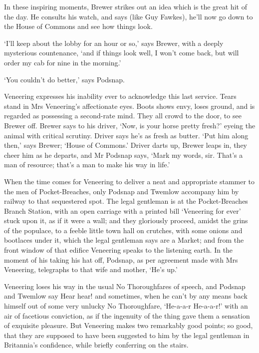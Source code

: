 In these inspiring moments, Brewer strikes out an idea which is the
great hit of the day. He consults his watch, and says (like Guy Fawkes),
he’ll now go down to the House of Commons and see how things look.

‘I’ll keep about the lobby for an hour or so,’ says Brewer, with a
deeply mysterious countenance, ‘and if things look well, I won’t come
back, but will order my cab for nine in the morning.’

‘You couldn’t do better,’ says Podsnap.

Veneering expresses his inability ever to acknowledge this last service.
Tears stand in Mrs Veneering’s affectionate eyes. Boots shows envy,
loses ground, and is regarded as possessing a second-rate mind. They all
crowd to the door, to see Brewer off. Brewer says to his driver, ‘Now,
is your horse pretty fresh?’ eyeing the animal with critical scrutiny.
Driver says he’s as fresh as butter. ‘Put him along then,’ says Brewer;
‘House of Commons.’ Driver darts up, Brewer leaps in, they cheer him as
he departs, and Mr Podsnap says, ‘Mark my words, sir. That’s a man of
resource; that’s a man to make his way in life.’

When the time comes for Veneering to deliver a neat and appropriate
stammer to the men of Pocket-Breaches, only Podsnap and Twemlow
accompany him by railway to that sequestered spot. The legal gentleman
is at the Pocket-Breaches Branch Station, with an open carriage with a
printed bill ‘Veneering for ever’ stuck upon it, as if it were a wall;
and they gloriously proceed, amidst the grins of the populace, to a
feeble little town hall on crutches, with some onions and bootlaces
under it, which the legal gentleman says are a Market; and from the
front window of that edifice Veneering speaks to the listening earth.
In the moment of his taking his hat off, Podsnap, as per agreement made
with Mrs Veneering, telegraphs to that wife and mother, ‘He’s up.’

Veneering loses his way in the usual No Thoroughfares of speech, and
Podsnap and Twemlow say Hear hear! and sometimes, when he can’t by any
means back himself out of some very unlucky No Thoroughfare, ‘He-a-a-r
He-a-a-r!’ with an air of facetious conviction, as if the ingenuity of
the thing gave them a sensation of exquisite pleasure. But Veneering
makes two remarkably good points; so good, that they are supposed
to have been suggested to him by the legal gentleman in Britannia’s
confidence, while briefly conferring on the stairs.

